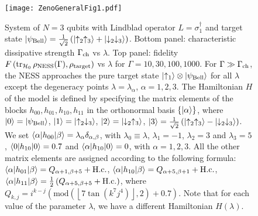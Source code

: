 \documentclass[aps,pra,letterpaper,twocolumn,showpacs,superscriptaddress,floatfix,longbibliography]{revtex4-1}
\newcommand{\traccazero}{\mathop{\mathrm{tr}_{\mathcal{H}_0}}\limits}
\newcommand{\hc}{\mathop{\mathrm{H.c.}}\limits}
\begin{document}
\begin{figure}[t]
  \begin{center}
    \texttt{[image: ZenoGeneralFig1.pdf]}
    \caption{System of $N=3$ qubits with Lindblad operator
      $L=\sigma_1^\dag$ and target state
      $|{\psi_{\rm{Bell}}}\rangle=\textstyle{\frac{1}{\sqrt{2}}} \left(
        |{\uparrow_2 \uparrow_3}\rangle + |{\downarrow_2
          \downarrow_3}\rangle\right)$.  Bottom panel: characteristic
      dissipative strength $\Gamma_{\rm{ch}}$ vs $\lambda$. Top panel:
      fidelity $F\left( \traccazero\rho_{\rm{NESS}}(\Gamma),
        \rho_{\rm{target}} \right)$ vs $\lambda$ for
      $\Gamma=10,30,100,1000$.  For $\Gamma\gg \Gamma_{\rm{ch}}$, the
      NESS approaches the pure target state
      $|{\uparrow_1}\rangle\otimes|{\psi_{\rm{Bell}}}\rangle$ for all
      $\lambda$ except the degeneracy points $\lambda=\lambda_\alpha$,
      $\alpha=1,2,3$.  The Hamiltonian $H$ of the model is defined by
      specifying the matrix elements of the blocks
      $h_{00},h_{01},h_{10},h_{11}$ in the orthonormal basis
      $\{|{\alpha}\rangle\}$, where $|{0}\rangle=|{\psi_{\rm{Bell}}}\rangle$,
      $|{1}\rangle=|{\uparrow_2\downarrow_3}\rangle$,
      $|{2}\rangle=|{\downarrow_2\uparrow_3}\rangle$, $|{3}\rangle=
      \frac{1}{\sqrt{2}} \left( |{\uparrow_2 \uparrow_3}\rangle -
        |{\downarrow_2 \downarrow_3}\rangle\right)$.  We set
      $\langle{\alpha}|h_{00}|{\beta}\rangle=\lambda_\alpha
      \delta_{\alpha,\beta}$, with $\lambda_0\equiv\lambda$,
      $\lambda_1=-1$, $\lambda_2=3$ and $\lambda_3=5$,
      $\langle{0}|h_{10}|{0}\rangle=0.7$ and $\langle{\alpha}|h_{10}|{0}\rangle=0$,
      with $\alpha=1,2,3$.  All the other matrix elements are assigned
      according to the following formula:
      $\bra{\alpha}h_{01}\ket{\beta}=Q_{\alpha+1,\beta+5}+\hc$,
      $\bra{\alpha}h_{10}\ket{\beta}=Q_{\alpha+5,\beta+1}+\hc$,
      $\bra{\alpha}h_{11}\ket{\beta}=\frac{1}{2}
      \left(Q_{\alpha+5,\beta+5}+\hc\right)$, where
      $Q_{k,j}=i^{k-j}\left(\mathrm{mod}\left(\left\lfloor 7 \tan(k^7
            j^4) \right\rfloor,2\right)+0.7\right)$.  Note that for
      each value of the parameter $\lambda$, we have a different
      Hamiltonian $H(\lambda)$. }
    \label{Fidelity&Gammach_vs_lambda}
  \end{center}
\end{figure}
\end{document}
